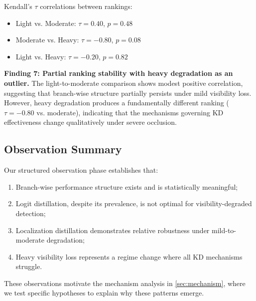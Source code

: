 Kendall's $\tau$ correlations between rankings:
\begin{itemize}
    \item Light vs. Moderate: $\tau = 0.40$, $p = 0.48$
    \item Moderate vs. Heavy: $\tau = -0.80$, $p = 0.08$
    \item Light vs. Heavy: $\tau = -0.20$, $p = 0.82$
\end{itemize}

\textbf{Finding 7: Partial ranking stability with heavy degradation as an outlier.} The light-to-moderate comparison shows modest positive correlation, suggesting that branch-wise structure partially persists under mild visibility loss. However, heavy degradation produces a fundamentally different ranking ($\tau = -0.80$ vs. moderate), indicating that the mechanisms governing KD effectiveness change qualitatively under severe occlusion.

\subsection{Observation Summary}

Our structured observation phase establishes that:
\begin{enumerate}
    \item Branch-wise performance structure exists and is statistically meaningful;
    \item Logit distillation, despite its prevalence, is not optimal for visibility-degraded detection;
    \item Localization distillation demonstrates relative robustness under mild-to-moderate degradation;
    \item Heavy visibility loss represents a regime change where all KD mechanisms struggle.
\end{enumerate}

These observations motivate the mechanism analysis in \cref{sec:mechanism}, where we test specific hypotheses to explain why these patterns emerge.
